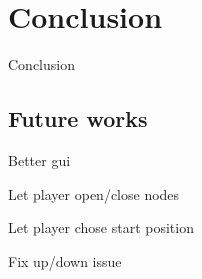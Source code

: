 \section{Conclusion}
\label{05}

Conclusion

\subsection{Future works}
\label{05_01}
Better gui

Let player open/close nodes

Let player chose start position

Fix up/down issue